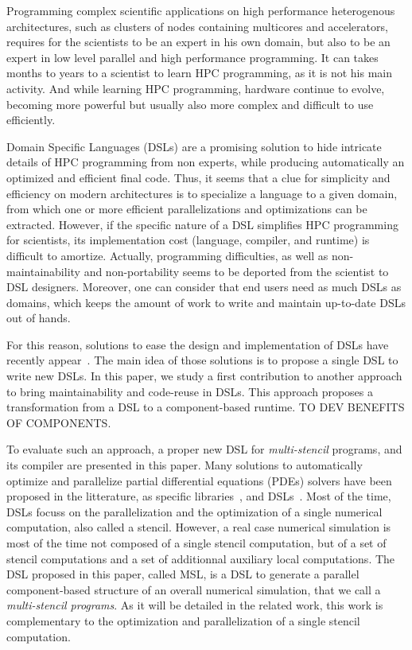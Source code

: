 Programming complex scientific applications on high performance heterogenous architectures, such as clusters of nodes containing multicores and accelerators, requires for the scientists to be an expert in his own domain, but also to be an expert in low level parallel and high performance programming. It can takes months to years to a scientist to learn HPC programming, as it is not his main activity. And while learning HPC programming, hardware continue to evolve, becoming more powerful but usually also more  complex and difficult to use efficiently.

Domain Specific Languages (DSLs) are a promising solution to hide intricate details of HPC programming from non experts, while producing automatically an optimized and efficient final code. Thus, it seems that a clue for simplicity and efficiency on modern architectures is to specialize a language to a given domain, from which one or more efficient parallelizations and optimizations can be extracted.
However, if the specific nature of a DSL simplifies HPC programming for scientists, its implementation cost (language, compiler, and runtime) is difficult to amortize. Actually, programming difficulties, as well as non-maintainability and non-portability seems to be deported from the scientist to DSL designers. Moreover, one can consider that end users need as much DSLs as domains, which keeps the amount of work to write and maintain up-to-date DSLs out of hands.

For this reason, solutions to ease the design and implementation of DSLs have recently appear~\cite{Fernandez:2014:DFL:2691166.2691168}. The main idea of those solutions is to propose a single DSL to write new DSLs. In this paper, we study a first contribution to another approach to bring maintainability and code-reuse in DSLs. This approach proposes a transformation from a DSL to a component-based runtime. TO DEV BENEFITS OF COMPONENTS.

To evaluate such an approach, a proper new DSL for \emph{multi-stencil} programs, and its compiler are presented in this paper. Many solutions to automatically optimize and parallelize partial differential equations (PDEs) solvers have been proposed in the litterature, as specific libraries~\cite{petsc-efficient,Trilinos-Overview,CPE:CPE3494}, and DSLs~\cite{spaaTangCKLL11,citeulike12258902,Giles2011,DeVito2011LDS}. Most of the time, DSLs focuss on the parallelization and the optimization of a single numerical computation, also called a stencil.
However, a real case numerical simulation is most of the time not composed of a single stencil computation, but of a set of stencil computations and a set of additionnal auxiliary local computations. The DSL proposed in this paper, called MSL, is a DSL to generate a parallel component-based structure of an overall numerical simulation, that we call a \emph{multi-stencil programs}. As it will be detailed in the related work, this work is complementary to the optimization and parallelization of a single stencil computation.

